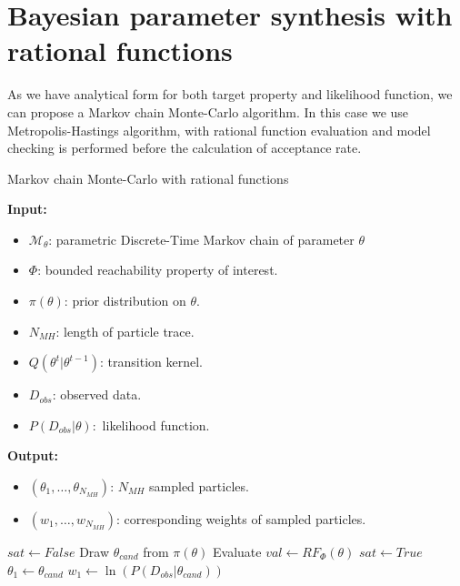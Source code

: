 \section{Bayesian parameter synthesis with rational functions}
\newpage
As we have analytical form for both target property and likelihood function, we can propose a Markov
chain Monte-Carlo algorithm. In this case we use Metropolis-Hastings algorithm, with rational
function evaluation and model checking is performed before the calculation of acceptance rate.
\begin{algorithm}[H]
    \caption{Markov chain Monte-Carlo with rational functions}
    \label{rf-mcmc-alg}
    \hspace*{\algorithmicindent} \textbf{Input:}
    \begin{itemize}
        \item $\mathcal{M}_\theta$: parametric Discrete-Time Markov chain of parameter $\theta$
        \item $\Phi$: bounded reachability property of interest.
        \item $\pi(\theta)$: prior distribution on $\theta$.
        \item $N_{MH}$: length of particle trace.
        \item $Q(\theta^t|\theta^{t-1})$: transition kernel.
        \item $D_{obs}$: observed data.
        \item $P(D_{obs}|\theta):$ likelihood function.
    \end{itemize}
    \hspace*{\algorithmicindent} \textbf{Output:}
    \begin{itemize}
        \item $(\theta_1,\ldots,\theta_{N_{MH}})$: $N_{MH}$ sampled particles.
        \item $(w_1,\ldots,w_{N_{MH}})$: corresponding weights of sampled particles.
    \end{itemize}
    \begin{algorithmic}[1]
        \State $sat \leftarrow False$
        \State Draw $\theta_{cand}$ from $\pi(\theta)$
        \State Evaluate $val \leftarrow RF_{\Phi}(\theta)$
        \State $sat \leftarrow True$
        \EndIf
        \EndWhile
        \State $\theta_1 \leftarrow  \theta_{cand}$
        \State $w_1 \leftarrow  \ln(P(D_{obs}|\theta_{cand}))$
    \end{algorithmic}
\end{algorithm}

